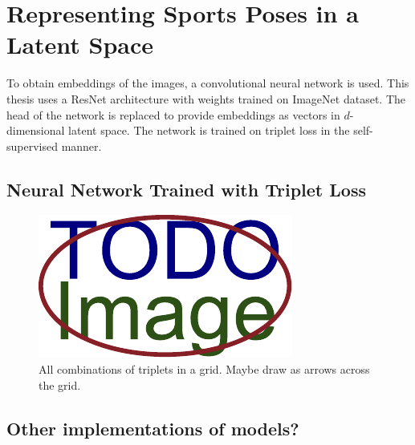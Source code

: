 \chapter{\label{chap:representing}Representing Sports Poses in a Latent Space}

To obtain embeddings of the images, a convolutional neural network is used. This thesis uses a ResNet architecture with weights trained on ImageNet dataset. The head of the network is replaced to provide embeddings as vectors in $d$-dimensional latent space. The network is trained on triplet loss in the self-supervised manner.

\blindtext

\blindtext

\section{Neural Network Trained with Triplet Loss}

\blindtext

\blindtext

\begin{figure}[ht]\centering
  \centering
  \includegraphics{figures/placeholder.pdf}
  \caption{All combinations of triplets in a grid. Maybe draw as arrows across the grid.}
  \label{TripletsInGrid}
\end{figure}

\blindtext

\section{Other implementations of models?}

\blindtext

\blindtext

\blindtext
